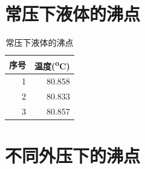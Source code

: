 \documentclass[11pt]{report}
\begin{document}
\section{常压下液体的沸点}
\label{sec:org352c2e2}
\begin{table}[htbp]
\caption{常压下液体的沸点}
\centering
\begin{tabular}{rr}
序号 & 温度(\textsuperscript{o}C)\\
\hline
1 & 80.858\\
2 & 80.833\\
3 & 80.857\\
\end{tabular}
\end{table}

\section{不同外压下的沸点}
\label{sec:orge6ea5d4}
\end{document}

